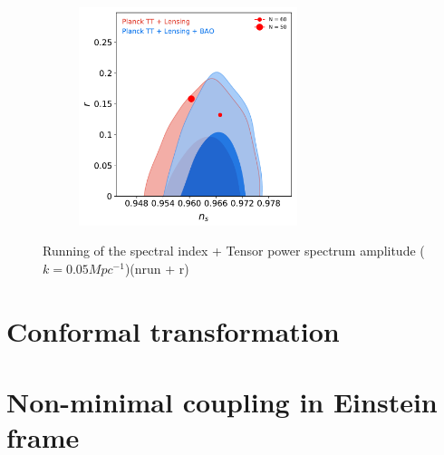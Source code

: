 \begin{figure}[H]
\begin{subfigure}[b]{.5\textwidth}
\end{subfigure}
\begin{subfigure}[b]{.5\textwidth}
\centering
\includegraphics[width=0.7\textwidth]{./figures/fig3.pdf}
\end{subfigure}
\caption{Running of the spectral index + Tensor power spectrum amplitude ($k = 0.05 Mpc^{-1}$)(nrun + r)}
\end{figure}

\section{Conformal transformation}


\section{Non-minimal coupling in Einstein frame}


